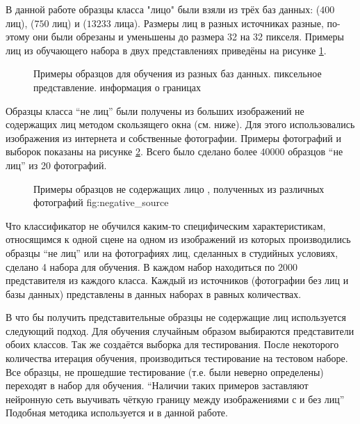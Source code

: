 \documentclass[12pt]{report}
\begin{document}
В данной работе образцы класса "лицо" были взяли из трёх баз данных: \citep{samaria1994parameterisation} ($400$ 
лиц), 
\citep{GeorgiaTechFaceDatabase} ($750$ лиц) и \citep{huang2007labeled} ($13 233$ лица). Размеры лиц в разных 
источниках разные, по-этому они были  обрезаны и уменьшены до размера 32 на 32 пикселя. Примеры лиц из обучающего 
набора в двух представлениях приведёны на рисунке \ref{fig:sample_faces}.

\begin{figure}[h]
	\centering
	\caption{Примеры образцов для обучения из разных баз данных.  пиксельное представление. 
 информация о границах}
	\label{fig:sample_faces}
\end{figure}

Образцы класса ``не лиц'' были получены из больших изображений не содержащих лиц методом скользящего окна (см. 
ниже). 
Для этого использовались изображения из интернета и собственные фотографии. Примеры фотографий и выборок показаны 
на 
рисунке \ref{fig:sample_nonfaces}. Всего было сделано более $40 000$ образцов ``не лиц'' из 20 фотографий.

\begin{figure}[h]
	\centering
	\caption{Примеры образцов не содержащих лицо , полученных из различных фотографий \subref
{fig:negative_source}}
	\label{fig:sample_nonfaces}
\end{figure}

Что классификатор не обучился каким-то специфическим характеристикам, относящимся к одной сцене на одном из 
изображений из которых производились образцы ``не лиц'' или на фотографиях лиц, сделанных в студийных условиях, 
сделано 4 набора для обучения. В каждом набор находиться по $2 000$ представителя из каждого класса. Каждый из 
источников (фотографии без лиц и базы данных) представлены в данных наборах в равных количествах.

В \citep{rowley1998neural} что бы получить представительные образцы не содержащие лиц используется следующий 
подход. 
Для обучения случайным образом выбираются представители обоих классов. Так же создаётся выборка для тестирования. 
После некоторого количества итерация обучения, производиться тестирование на тестовом наборе. Все образцы, не 
прошедшие тестирование (т.е. были неверно определены) переходят в набор для обучения. ``Наличии таких примеров 
заставляют нейронную сеть выучивать чёткую границу между изображениями с и без лиц'' \citep{rowley1998neural} 
Подобная методика используется и в данной работе.
\end{document}
